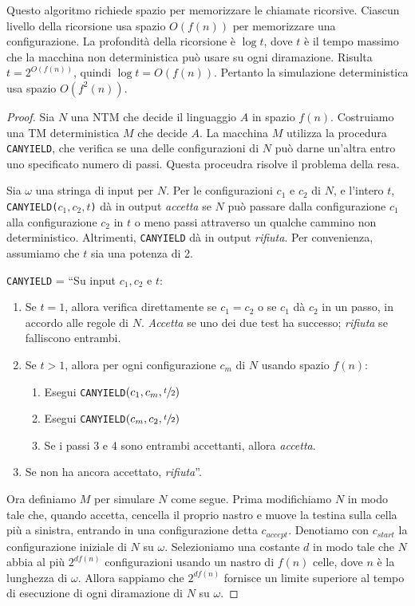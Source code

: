 \documentclass[12pt]{report}
\begin{document}
Questo algoritmo richiede spazio per memorizzare le chiamate ricorsive. Ciascun livello della ricorsione usa spazio $O(f(n))$ per memorizzare una configurazione. La profondità della ricorsione è $\log t$, dove $t$ è il tempo massimo che la macchina non deterministica può usare su ogni diramazione. Risulta $t = 2^{O(f(n))}$, quindi $\log t = O(f(n))$. Pertanto la simulazione deterministica usa spazio $O\left(f^2(n)\right)$.
\begin{proof}
	Sia $N$ una NTM che decide il linguaggio $A$ in spazio $f(n)$. Costruiamo una TM deterministica $M$ che decide $A$. La macchina $M$ utilizza la procedura \texttt{CANYIELD}, che verifica se una delle configurazioni di $N$ può darne un'altra entro uno specificato numero di passi. Questa proceudra risolve il problema della resa.

	Sia $\omega$ una stringa di input per $N$. Per le configurazioni $c_1$ e $c_2$ di $N$, e l'intero $t$, \texttt{CANYIELD($c_1, c_2, t$)} dà in output \textit{accetta} se  $N$ può passare dalla configurazione $c_1$ alla configurazione $c_2$ in $t$ o meno passi attraverso un qualche cammino non deterministico. Altrimenti, \texttt{CANYIELD} dà in output \textit{rifiuta}. Per convenienza, assumiamo che $t$ sia una potenza di 2.

	\texttt{CANYIELD} = ``Su input $c_1, c_2$ e $t$:
	\begin{enumerate}
		\item Se $t=1$, allora verifica direttamente se $c_1 = c_2$ o se $c_1$ dà $c_2$ in un passo, in accordo alle regole di $N$. \textit{Accetta} se uno dei due test ha successo; \textit{rifiuta} se falliscono entrambi.
		\item Se $t > 1$, allora per ogni configurazione $c_m$ di $N$ usando spazio $f(n)$:
		\begin{enumerate}
			\item Esegui \texttt{CANYIELD$\left(c_1, c_m, \sfrac{t}{2}\right)$}
			\item Esegui \texttt{CANYIELD$\left(c_m, c_2, \sfrac{t}{2}\right)$}
			\item Se i passi 3 e 4 sono entrambi accettanti, allora \textit{accetta}.
		\end{enumerate}
		\item Se non ha ancora accettato, \textit{rifiuta}''.
	\end{enumerate}
	Ora definiamo $M$ per simulare $N$ come segue. Prima modifichiamo $N$ in modo tale che, quando accetta, cencella il proprio nastro e muove la testina sulla cella più a sinistra, entrando in una configurazione detta $c_{accept}$. Denotiamo con $c_{start}$ la configurazione iniziale di $N$ su $\omega$. Selezioniamo una costante $d$ in modo tale che $N$ abbia al più $2^{df(n)}$ configurazioni usando un nastro di $f(n)$ celle, dove $n$ è la lunghezza di $\omega$. Allora sappiamo che $2^{df(n)}$ fornisce un limite superiore al tempo di esecuzione di ogni diramazione di $N$ su $\omega$.


\end{proof}
\end{document}
